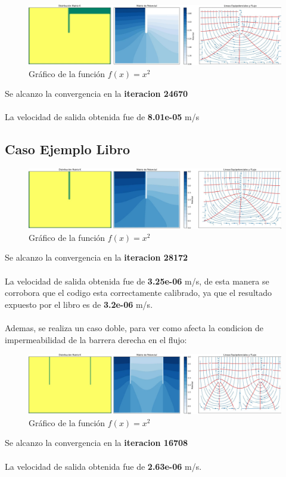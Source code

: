 \begin{figure}[H]
    \centering
    \includegraphics[width=1\textwidth]{GRAFICOS/laplace_caso_3.jpg}
    \caption{Gráfico de la función $f(x) = x^2$}
    \label{fig:caso_3}
\end{figure}

Se alcanzo la convergencia en la \textbf{iteracion 24670}
\\ \\
La velocidad de salida obtenida fue de \textbf{8.01e-05} m/s

\subsection{Caso Ejemplo Libro}

\begin{figure}[H]
    \centering
    \includegraphics[width=1\textwidth]{GRAFICOS/laplace_caso_ejemplo.jpg}
    \caption{Gráfico de la función $f(x) = x^2$}
    \label{fig:caso_ejemplo}
\end{figure}

Se alcanzo la convergencia en la \textbf{iteracion 28172}
\\ \\
La velocidad de salida obtenida fue de \textbf{3.25e-06} m/s, de esta manera se corrobora que el codigo esta correctamente calibrado, ya que el resultado expuesto por el libro es de \textbf{3.2e-06} m/s.
\\ \\
Ademas, se realiza un caso doble, para ver como afecta la condicion de impermeabilidad de la barrera derecha en el flujo:

\begin{figure}[H]
    \centering
    \includegraphics[width=1\textwidth]{GRAFICOS/laplace_caso_ejemplo_doble.jpg}
    \caption{Gráfico de la función $f(x) = x^2$}
    \label{fig:caso_ejemplo}
\end{figure}

Se alcanzo la convergencia en la \textbf{iteracion 16708}
\\ \\
La velocidad de salida obtenida fue de \textbf{2.63e-06} m/s.